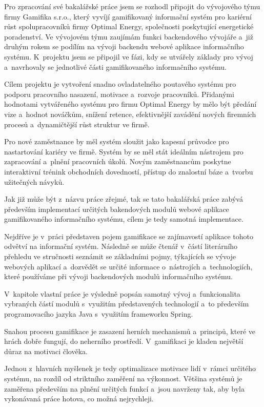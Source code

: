 \documentclass[twoside, 12pt]{article}
\begin{document}
Pro zpracování své bakalářské práce
jsem se rozhodl připojit do vývojového týmu firmy Gamifika s.r.o.,
který vyvíjí gamifikovaný informační systém
pro kariérní růst spolupracovníků firmy Optimal Energy,
společnosti poskytující energetické poradenství.
Ve vývojovém týmu zaujímám funkci backendového vývojáře
a~již druhým rokem se podílím na vývoji backendu webové aplikace informačního systému.
K~projektu jsem se připojil ve fázi, kdy se utvářely základy pro vývoj
a~navrhovaly se jednotlivé části gamifikovaného informačního systému.


Cílem projektu je vytvoření snadno ovladatelného poutavého systému
pro podporu pracovního nasazení, motivace a~rozvoje pracovníků.
Přidanými hodnotami vytvářeného systému pro firmu Optimal Energy
by mělo být předání vize a~hodnot nováčkům, snížení retence,
efektivnější zavádění nových firemních procesů
a~dynamičtější růst struktur ve firmě.


Pro nové zaměstnance by měl systém sloužit
jako kapesní průvodce pro nastartování kariéry ve firmě.
Systém by se měl stát ideálním nástrojem pro zapracování
a~plnění pracovních úkolů.
Novým zaměstnancům poskytne interaktivní trénink obchodních dovedností,
přístup do znalostní báze a~tvorbu užitečných návyků.


Jak již může být z~názvu práce zřejmé, tak se tato bakalářská práce
zabývá především implementací určitých bakendových modulů webové aplikace
gamifikovaného informačního systému, cílem je tedy samotná implementace.


Nejdříve je v~práci představen pojem gamifikace se
zajímavostí aplikace tohoto odvětví na informační systém.
Následně se může čtenář v~částí literárního přehledu
ve stručnosti seznámit se základními pojmy,
týkajících se vývoje webových aplikací a~dozvědět se určité informace o~nástrojích a~technologiích,
které používáme při vývoji backendových modulů informačního systému.

V~kapitole vlastní práce je výsledně popsán samotný vývoj a~funkcionalita
vybraných částí modulů s~využitím představených technologií
a~to především programovacího jazyka Java s~využitím frameworku Spring.



Snahou procesu gamifikace je zasazení herních mechanismů a~principů,
které ve hrách dobře fungují, do neherního prostředí.
V~gamifikaci je kladen největší důraz na motivaci člověka.

Jednou z~hlavních myšlenek je tedy optimalizace motivace lidí
v~rámci určitého systému, na rozdíl od striktního zaměření na výkonnost.
Většina systémů je zaměřena především na plnění určitých funkcí
a~jsou navrženy tak, aby byla vykonávaná práce hotova, co možná nejrychleji.
\end{document}
